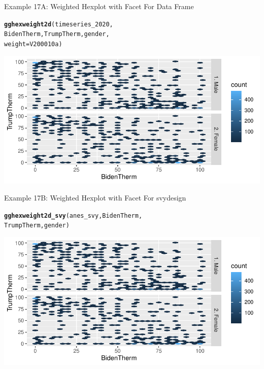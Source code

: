 \documentclass{beamer}\usepackage[]{graphicx}\usepackage[]{xcolor}
\makeatletter
\newcommand{\hlstd}[1]{\textcolor[rgb]{0.345,0.345,0.345}{#1}}%
\newcommand{\hlkwc}[1]{\textcolor[rgb]{0.333,0.667,0.333}{#1}}%
\newcommand{\hlkwd}[1]{\textcolor[rgb]{0.737,0.353,0.396}{\textbf{#1}}}%
\newenvironment{kframe}{%
 \def\at@end@of@kframe{}%
 \ifinner\ifhmode%
  \def\at@end@of@kframe{\end{minipage}}%
  \begin{minipage}{\columnwidth}%
 \fi\fi%
 \def\FrameCommand##1{\hskip\@totalleftmargin \hskip-\fboxsep
 \colorbox{shadecolor}{##1}\hskip-\fboxsep
     \hskip-\linewidth \hskip-\@totalleftmargin \hskip\columnwidth}%
 \MakeFramed {\advance\hsize-\width
   \@totalleftmargin\z@ \linewidth\hsize
   \@setminipage}}%
 {\par\unskip\endMakeFramed%
 \at@end@of@kframe}
\newenvironment{knitrout}{}{} %
\makeatother
\begin{document}
\begin{frame}[fragile]{Example 17A: Weighted Hexplot with Facet For Data Frame}
\begin{knitrout}
\color{fgcolor}\begin{kframe}
\begin{alltt}
\hlkwd{gghexweight2d}\hlstd{(timeseries_2020,}
    \hlstd{BidenTherm, TrumpTherm, gender,}
    \hlkwc{weight} \hlstd{= V200010a)}
\end{alltt}
\end{kframe}
\includegraphics[width=0.95\linewidth]{figure/unnamed-chunk-84-1} 
\end{knitrout}

\end{frame}


\begin{frame}[fragile]{Example 17B: Weighted Hexplot with Facet For svydesign}

\begin{knitrout}
\color{fgcolor}\begin{kframe}
\begin{alltt}
\hlkwd{gghexweight2d_svy}\hlstd{(anes_svy, BidenTherm,}
    \hlstd{TrumpTherm, gender)}
\end{alltt}
\end{kframe}
\includegraphics[width=0.95\linewidth]{figure/unnamed-chunk-85-1} 
\end{knitrout}

\end{frame}
\end{document}
